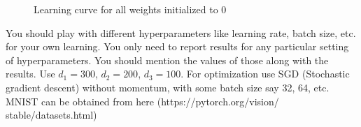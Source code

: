 \documentclass[10pt]{article}
\theoremstyle{definition}
\newenvironment{soln}{
    \leavevmode\color{blue}\ignorespaces
}{}
\begin{document}
\begin{enumerate}
\begin{soln}
\begin{figure}[H]
                \caption{Learning curve for all weights initialized to 0}
                \label{Fig3.main}
              \end{figure}
          \end{soln}
\end{enumerate}

You should play with different hyperparameters like learning rate, batch size, etc. for your own learning. You only need to report results for any particular setting of hyperparameters. You should mention the values of those along with the results. Use $d_1 = 300$, $d_2 = 200$, $d_3 = 100$. For optimization use SGD (Stochastic gradient descent) without momentum, with some batch size say 32, 64, etc. MNIST can be obtained from here (https://pytorch.org/vision/ stable/datasets.html)


\end{document}
